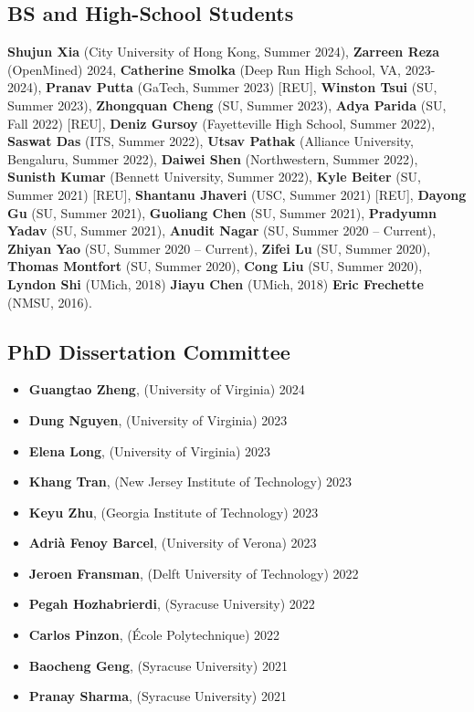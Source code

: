\subsection*{BS and High-School Students}
  \textbf{Shujun Xia} (City University of Hong Kong, Summer 2024), 
  \textbf{Zarreen Reza} (OpenMined) 2024, 
  \textbf{Catherine Smolka} (Deep Run High School, VA, 2023-2024), 
  \textbf{Pranav Putta} (GaTech, Summer 2023) [REU],
  \textbf{Winston Tsui} (SU, Summer 2023),
  \textbf{Zhongquan Cheng} (SU, Summer 2023), 
  \textbf{Adya Parida} (SU, Fall 2022) [REU], 
  \textbf{Deniz Gursoy} (Fayetteville High School, Summer 2022), 
  \textbf{Saswat Das} (ITS, Summer 2022), 
  \textbf{Utsav Pathak} (Alliance University, Bengaluru, Summer 2022),
  \textbf{Daiwei Shen} (Northwestern, Summer 2022),
  \textbf{Sunisth Kumar} (Bennett University, Summer 2022),
  \textbf{Kyle Beiter} (SU, Summer 2021) [REU],  %
  \textbf{Shantanu Jhaveri} (USC, Summer 2021) [REU], %
  \textbf{Dayong Gu} (SU, Summer 2021),
  \textbf{Guoliang Chen} (SU, Summer 2021),
  \textbf{Pradyumn Yadav} (SU, Summer 2021),
  \textbf{Anudit Nagar} (SU, Summer 2020 -- Current), 
  \textbf{Zhiyan Yao} (SU, Summer 2020 -- Current),
  \textbf{Zifei Lu} (SU, Summer 2020),
  \textbf{Thomas Montfort} (SU, Summer 2020),
  \textbf{Cong Liu} (SU, Summer 2020),
  \textbf{Lyndon Shi} (UMich, 2018)
  \textbf{Jiayu Chen} (UMich, 2018)
  \textbf{Eric Frechette} (NMSU, 2016).

\medskip

\subsection*{PhD Dissertation Committee}
\begin{itemize}
  \item \textbf{Guangtao Zheng}, ({\sc University of Virginia}) \hfill 2024
  \item \textbf{Dung Nguyen}, ({\sc University of Virginia}) \hfill 2023
  \item \textbf{Elena Long}, ({\sc University of Virginia}) \hfill 2023
  \item \textbf{Khang Tran}, ({\sc New Jersey Institute of Technology}) \hfill 2023
  \item \textbf{Keyu Zhu}, ({\sc Georgia Institute of Technology}) \hfill 2023
  \item \textbf{Adrià Fenoy Barcel}, ({\sc University of Verona}) \hfill 2023
  \item \textbf{Jeroen Fransman}, ({\sc Delft University of Technology}) \hfill 2022
  \item \textbf{Pegah Hozhabrierdi}, ({\sc Syracuse University}) \hfill 2022
  \item \textbf{Carlos Pinzon}, ({\sc École Polytechnique}) \hfill 2022
  \item \textbf{Baocheng Geng}, ({\sc Syracuse University}) \hfill 2021
  \item \textbf{Pranay Sharma}, ({\sc Syracuse University}) \hfill 2021
\end{itemize}
\medskip